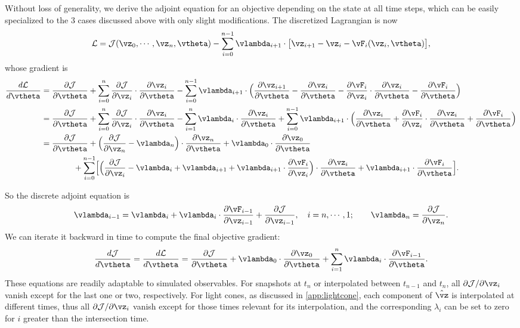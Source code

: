 \documentclass[modern, trackchanges, dvipsnames]{aastex631}
\renewcommand{\d}{d}
\newcommand{\p}{\partial}
\newcommand{\cJ}{\mathcal{J}}
\newcommand{\cL}{\mathcal{L}}
\begin{document}
Without loss of generality, we derive the adjoint equation for an
objective depending on the state at all time steps, which can be easily
specialized to the 3 cases discussed above with only slight
modifications.
The discretized Lagrangian is now
%
\begin{equation}
\cL = \cJ(\vz_0, \cdots, \vz_n, \vtheta)
- \sum_{i=0}^{n-1} \vlambda_{i+1}
  \cdot \bigl[ \vz_{i+1} - \vz_i - \vF_i(\vz_i, \vtheta) \bigr],
\end{equation}
%
whose gradient is
%
\begin{align}
\frac{\d\cL}{\d\vtheta}
&= \frac{\p\cJ}{\p\vtheta}
+ \sum_{i=0}^n \frac{\p\cJ}{\p\vz_i} \cdot \frac{\p\vz_i}{\p\vtheta}
- \sum_{i=0}^{n-1} \vlambda_{i+1}
  \cdot \Bigl( \frac{\p\vz_{i+1}}{\p\vtheta} - \frac{\p\vz_i}{\p\vtheta}
    - \frac{\p\vF_i}{\p\vz_i} \cdot \frac{\p\vz_i}{\p\vtheta}
    - \frac{\p\vF_i}{\p\vtheta} \Bigr) \nonumber\\
%
&= \frac{\p\cJ}{\p\vtheta}
+ \sum_{i=0}^n \frac{\p\cJ}{\p\vz_i} \cdot \frac{\p\vz_i}{\p\vtheta}
- \sum_{i=1}^n \vlambda_i \cdot \frac{\p\vz_i}{\p\vtheta}
+ \sum_{i=0}^{n-1} \vlambda_{i+1}
  \cdot \Bigl( \frac{\p\vz_i}{\p\vtheta}
    + \frac{\p\vF_i}{\p\vz_i} \cdot \frac{\p\vz_i}{\p\vtheta}
    + \frac{\p\vF_i}{\p\vtheta} \Bigr) \nonumber\\
&= \frac{\p\cJ}{\p\vtheta}
+ \Bigl( \frac{\p\cJ}{\p\vz_n} - \vlambda_n \Bigr)
  \cdot \frac{\p\vz_n}{\p\vtheta}
+ \vlambda_0 \cdot \frac{\p\vz_0}{\p\vtheta} \nonumber\\
&\hspace{4em} + \sum_{i=0}^{n-1} \Bigl[
  \Bigl( \frac{\p\cJ}{\p\vz_i} - \vlambda_i + \vlambda_{i+1}
    + \vlambda_{i+1} \cdot \frac{\p\vF_i}{\p\vz_i} \Bigr)
  \cdot \frac{\p\vz_i}{\p\vtheta}
  + \vlambda_{i+1} \cdot \frac{\p\vF_i}{\p\vtheta} \Bigr].
\end{align}

So the discrete adjoint equation is
%
\begin{equation}
\vlambda_{i-1} = \vlambda_i
  + \vlambda_i \cdot \frac{\p\vF_{i-1}}{\p\vz_{i-1}}
  + \frac{\p\cJ}{\p\vz_{i-1}},
\quad
i = n, \cdots, 1;
\qquad
\vlambda_n = \frac{\p\cJ}{\p\vz_n}.
\label{explicit_adj}
\end{equation}
%
We can iterate it backward in time to compute the final objective
gradient:
%
\begin{equation}
\frac{\d\cJ}{\d\vtheta}
= \frac{\d\cL}{\d\vtheta}
= \frac{\p\cJ}{\p\vtheta} + \vlambda_0 \cdot \frac{\p\vz_0}{\p\vtheta}
+ \sum_{i=1}^n \vlambda_i \cdot \frac{\p\vF_{i-1}}{\p\vtheta}.
\label{explicit_grad}
\end{equation}
These equations are readily adaptable to simulated observables.
For snapshots at $t_n$ or interpolated between $t_{n-1}$ and $t_n$,
all $\p\cJ / \p\vz_i$ vanish except for the last one or two,
respectively.
For light cones, as discussed in \autoref{app:lightcone}, each component
of $\hat\vz$ is interpolated at different times, thus all $\p\cJ /
\p\vz_i$ vanish except for those times relevant for its interpolation,
and the corresponding $\lambda_i$ can be set to zero for $i$ greater
than the intersection time.
\end{document}
